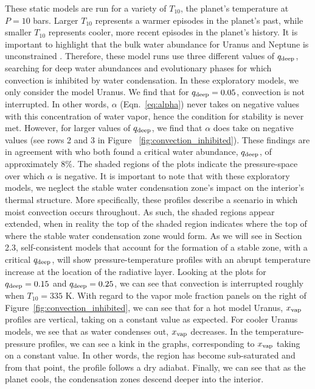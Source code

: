 \documentclass[11pt]{ucscthesisbs}
\begin{document}
These static models are run for a variety of $T_{10}$, the planet's temperature at $P=10$ bars. Larger $T_{10}$ represents a warmer episodes in the planet's past, while smaller $T_{10}$ represents cooler, more recent episodes in the planet's history.  It is important to highlight that the bulk water abundance for Uranus and Neptune is unconstrained \citep{guillot_1995}. Therefore, these model runs use three different values of $q_{\rm deep}$, searching for deep water abundances and evolutionary phases for which convection is inhibited by water condensation. In these exploratory models, we only consider the model Uranus. We find that for $q_{\rm deep} = 0.05$, convection is not interrupted. In other words, $\alpha$ (Eqn.~\ref{eq:alpha})  never takes on negative values with this concentration of water vapor, hence the condition for stability is never met. However, for larger values of $q_{\rm deep}$, we find that $\alpha$ does take{} on negative values (see rows 2 and 3 in Figure ~\ref{fig:convection_inhibited}). These findings are in agreement with \citep{friedson_2017,leconte_2017} who both found a critical water abundance, $q_{\rm deep}$, of approximately $8\%$. The shaded regions of the plots indicate the pressure-space over which $\alpha$ is negative. It is important to note that with these exploratory models, we neglect the stable water condensation zone's impact on the interior's thermal structure. More specifically, these profiles describe a scenario in which moist convection occurs throughout. As such, the shaded regions appear extended, when in reality the top of the shaded region indicates where the top of where the stable water condensation zone would form. As we will see in Section 2.3, self-consistent models that account for the formation of a stable zone, with a critical $q_{\rm deep}$, will show pressure-temperature profiles with an abrupt temperature increase at the location of the radiative layer. Looking at the plots for $q_{\rm deep} = 0.15$ and $q_{\rm deep} = 0.25$, we can see that convection is interrupted roughly when $T_{10} = 335$ K. With regard to the vapor mole fraction panels on the right of Figure~\ref{fig:convection_inhibited}, we can see that for a hot model Uranus, $x_{\rm vap}$ profiles are vertical, taking on a constant value as expected. For cooler Uranus models, we see that as water condenses out, $x_{\rm vap}$ decreases. In the temperature-pressure profiles, we can see a kink in the graphs, corresponding to $x_{\rm vap}$ taking on a constant value. In other words, the region has become sub-saturated and from that point, the profile follows a dry adiabat. Finally, we can see that as the planet cools, the condensation zones descend deeper into the interior.
\end{document}
